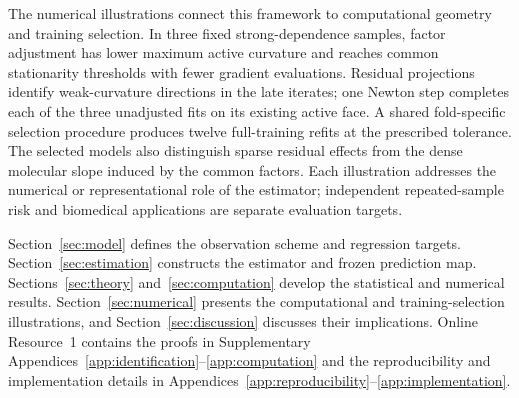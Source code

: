 The numerical illustrations connect this framework to computational geometry and training selection. In three fixed strong-dependence samples, factor adjustment has lower maximum active curvature and reaches common stationarity thresholds with fewer gradient evaluations. Residual projections identify weak-curvature directions in the late iterates; one Newton step completes each of the three unadjusted fits on its existing active face. A shared fold-specific selection procedure produces twelve full-training refits at the prescribed tolerance. The selected models also distinguish sparse residual effects from the dense molecular slope induced by the common factors. Each illustration addresses the numerical or representational role of the estimator; independent repeated-sample risk and biomedical applications are separate evaluation targets.

Section~\ref{sec:model} defines the observation scheme and regression targets. Section~\ref{sec:estimation} constructs the estimator and frozen prediction map. Sections~\ref{sec:theory} and~\ref{sec:computation} develop the statistical and numerical results. Section~\ref{sec:numerical} presents the computational and training-selection illustrations, and Section~\ref{sec:discussion} discusses their implications. Online Resource~1 contains the proofs in Supplementary Appendices~\ref{app:identification}--\ref{app:computation} and the reproducibility and implementation details in Appendices~\ref{app:reproducibility}--\ref{app:implementation}.
